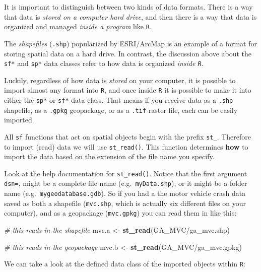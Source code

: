 \documentclass[
]{book}
\newenvironment{Shaded}{\begin{snugshade}}{\end{snugshade}}
\newcommand{\CommentTok}[1]{\textcolor[rgb]{0.56,0.35,0.01}{\textit{#1}}}
\newcommand{\FunctionTok}[1]{\textcolor[rgb]{0.13,0.29,0.53}{\textbf{#1}}}
\newcommand{\NormalTok}[1]{#1}
\newcommand{\OtherTok}[1]{\textcolor[rgb]{0.56,0.35,0.01}{#1}}
\newcommand{\StringTok}[1]{\textcolor[rgb]{0.31,0.60,0.02}{#1}}
\begin{document}
It is important to distinguish between two kinds of data formats. There is a way that data is \emph{stored on a computer hard drive}, and then there is a way that data is organized and managed \emph{inside a program} like \texttt{R}.

The \emph{shapefiles} (\texttt{.shp}) popularized by ESRI/ArcMap is an example of a format for storing spatial data on a hard drive. In contrast, the discussion above about the \texttt{sf*} and \texttt{sp*} data classes refer to how data is organized \emph{inside \texttt{R}}.

Luckily, regardless of how data is \emph{stored} on your computer, it is possible to import almost any format into \texttt{R}, and once inside \texttt{R} it is possible to make it into either the \texttt{sp*} or \texttt{sf*} data class. That means if you receive data as a \texttt{.shp} shapefile, as a \texttt{.gpkg} geopackage, or as a \texttt{.tif} raster file, each can be easily imported.

All \texttt{sf} functions that act on spatial objects begin with the prefix \texttt{st\_}. Therefore to import (read) data we will use \texttt{st\_read()}. This function determines \textbf{how} to import the data based on the extension of the file name you specify.

Look at the help documentation for \texttt{st\_read()}. Notice that the first argument \texttt{dsn=}, might be a complete file name (e.g.~\texttt{myData.shp}), or it might be a folder name (e.g.~\texttt{mygeodatabase.gdb}). So if you had a the motor vehicle crash data saved as both a shapefile (\texttt{mvc.shp}, which is actually six different files on your computer), and as a geopackage (\texttt{mvc.gpkg}) you can read them in like this:

\begin{Shaded}
\begin{Highlighting}[]
\CommentTok{\# this reads in the shapefile}
\NormalTok{mvc.a }\OtherTok{\textless{}{-}} \FunctionTok{st\_read}\NormalTok{(}\StringTok{\textquotesingle{}GA\_MVC/ga\_mvc.shp\textquotesingle{}}\NormalTok{)}

\CommentTok{\# this reads in the geopackage}
\NormalTok{mvc.b }\OtherTok{\textless{}{-}} \FunctionTok{st\_read}\NormalTok{(}\StringTok{\textquotesingle{}GA\_MVC/ga\_mvc.gpkg\textquotesingle{}}\NormalTok{)}
\end{Highlighting}
\end{Shaded}

We can take a look at the defined data class of the imported objects within \texttt{R}:
\end{document}
